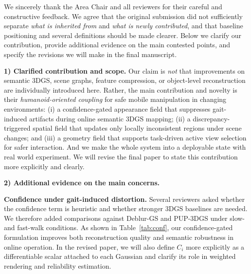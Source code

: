 \documentclass[conference]{IEEEtran}
\begin{document}

We sincerely thank the Area Chair and all reviewers for their careful and constructive feedback. We agree that the original submission did not sufficiently separate \emph{what is inherited from} and \emph{what is newly contributed}, and that baseline positioning and several definitions should be made clearer. Below we clarify our contribution, provide additional evidence on the main contested points, and specify the revisions we will make in the final manuscript.

\textbf{1) Clarified contribution and scope.}
Our claim is \emph{not} that improvements on semantic 3DGS, scene graphs, feature compression, or object-level reconstruction are individually introduced here. Rather, the main contribution and novelty is their \emph{humanoid-oriented coupling} for safe mobile manipulation in changing environments: 
(i) a confidence-gated appearance field that suppresses gait-induced artifacts during online semantic 3DGS mapping; 
(ii) a discrepancy-triggered spatial field that updates only locally inconsistent regions under scene changes; and 
(iii) a geometry field that supports task-driven active view selection for safer interaction. And we make the whole system into a deployable state with real world experiment. 
We will revise the final paper to state this contribution more explicitly and clearly.

\textbf{2) Additional evidence on the main concerns.}

\textbf{Confidence under gait-induced distortion.}
Several reviewers asked whether the confidence term is heuristic and whether stronger 3DGS baselines are needed. We therefore added comparisons against Deblur-GS and PUP-3DGS under slow- and fast-walk conditions. As shown in Table~\ref{tab:conf}, our confidence-gated formulation improves both reconstruction quality and semantic robustness in online operation. In the revised paper, we will also define $C_i$ more explicitly as a differentiable scalar attached to each Gaussian and clarify its role in weighted rendering and reliability estimation.
\end{document}
